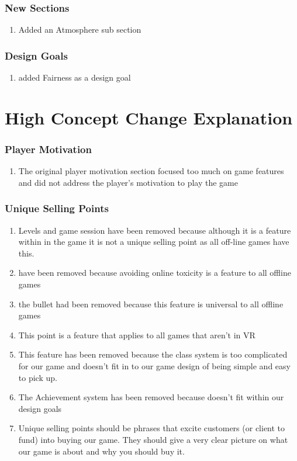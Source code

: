 \documentclass[]{article}
\begin{document}
\subsubsection*{New Sections}
\begin{enumerate}
	\item Added an Atmosphere sub section
\end{enumerate}
\subsubsection*{Design Goals}
\begin{enumerate}
	\item added Fairness as a design goal
\end{enumerate}

\section*{High Concept Change Explanation}
\subsubsection*{Player Motivation}
\begin{enumerate}
	\item The original player motivation section focused too much on game features and did not address the player's motivation to play the game
\end{enumerate}
\subsubsection*{Unique Selling Points}
\begin{enumerate}
	\item Levels and game session have been removed because although it is a feature within in the game it is not a unique selling point as all off-line games have this.
	\item  have been removed because avoiding online toxicity is a feature to all offline games 
	\item the bullet had been removed because this feature is universal to all offline games 
	\item This point is a feature that applies to all games that aren't in VR
	\item This feature has been removed because the class system is too complicated for our game and doesn't fit in to our game design of being simple and easy to pick up.
	\item The Achievement system has been removed because doesn't fit within our design goals
	\item Unique selling points should be phrases that excite customers (or client to fund) into buying our game. They should give a very clear picture on what our game is about and why you should buy it. 
\end{enumerate}
\end{document}
